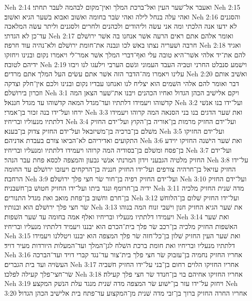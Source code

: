 Neh 2:14  ואעבר אל־שׁער העין ואל־ברכת המלך ואין־מקום לבהמה לעבר תחתי׃
Neh 2:15  ואהי עלה בנחל לילה ואהי שׂבר בחומה ואשׁוב ואבוא בשׁער הגיא ואשׁוב׃
Neh 2:16  והסגנים לא ידעו אנה הלכתי ומה אני עשׂה וליהודים ולכהנים ולחרים ולסגנים וליתר עשׂה המלאכה עד־כן לא הגדתי׃
Neh 2:17  ואומר אלהם אתם ראים הרעה אשׁר אנחנו בה אשׁר ירושׁלם חרבה ושׁעריה נצתו באשׁ לכו ונבנה את־חומת ירושׁלם ולא־נהיה עוד חרפה׃
Neh 2:18  ואגיד להם את־יד אלהי אשׁר־היא טובה עלי ואף־דברי המלך אשׁר אמר־לי ויאמרו נקום ובנינו ויחזקו ידיהם לטובה׃
Neh 2:19  וישׁמע סנבלט החרני וטביה העבד העמוני וגשׁם הערבי וילעגו לנו ויבזו עלינו ויאמרו מה־הדבר הזה אשׁר אתם עשׂים העל המלך אתם מרדים׃
Neh 2:20  ואשׁיב אותם דבר ואומר להם אלהי השׁמים הוא יצליח לנו ואנחנו עבדיו נקום ובנינו ולכם אין־חלק וצדקה וזכרון בירושׁלם׃
Neh 3:1  ויקם אלישׁיב הכהן הגדול ואחיו הכהנים ויבנו את־שׁער הצאן המה קדשׁוהו ויעמידו דלתתיו ועד־מגדל המאה קדשׁוהו עד מגדל חננאל׃
Neh 3:2  ועל־ידו בנו אנשׁי ירחו ועל־ידו בנה זכור בן־אמרי׃
Neh 3:3  ואת שׁער הדגים בנו בני הסנאה המה קרוהו ויעמידו דלתתיו מנעוליו ובריחיו׃
Neh 3:4  ועל־ידם החזיק מרמות בן־אוריה בן־הקוץ ועל־ידם החזיק משׁלם בן־ברכיה בן־משׁיזבאל ועל־ידם החזיק צדוק בן־בענא׃
Neh 3:5  ועל־ידם החזיקו התקועים ואדיריהם לא־הביאו צורם בעבדת אדניהם׃
Neh 3:6  ואת שׁער הישׁנה החזיקו יוידע בן־פסח ומשׁלם בן־בסודיה המה קרוהו ויעמידו דלתתיו ומנעליו ובריחיו׃
Neh 3:7  ועל־ידם החזיק מלטיה הגבעני וידון המרנתי אנשׁי גבעון והמצפה לכסא פחת עבר הנהר׃
Neh 3:8  על־ידו החזיק עזיאל בן־חרהיה צורפים ועל־ידו החזיק חנניה בן־הרקחים ויעזבו ירושׁלם עד החומה הרחבה׃
Neh 3:9  ועל־ידם החזיק רפיה בן־חור שׂר חצי פלך ירושׁלם׃
Neh 3:10  ועל־ידם החזיק ידיה בן־חרומף ונגד ביתו ועל־ידו החזיק חטושׁ בן־חשׁבניה׃
Neh 3:11  מדה שׁנית החזיק מלכיה בן־חרם וחשׁוב בן־פחת מואב ואת מגדל התנורים׃
Neh 3:12  ועל־ידו החזיק שׁלום בן־הלוחשׁ שׂר חצי פלך ירושׁלם הוא ובנותיו׃
Neh 3:13  את שׁער הגיא החזיק חנון וישׁבי זנוח המה בנוהו ויעמידו דלתתיו מנעליו ובריחיו ואלף אמה בחומה עד שׁער השׁפות׃
Neh 3:14  ואת שׁער האשׁפות החזיק מלכיה בן־רכב שׂר פלך בית־הכרם הוא יבננו ויעמיד דלתתיו מנעליו ובריחיו׃
Neh 3:15  ואת שׁער העין החזיק שׁלון בן־כל־חזה שׂר פלך המצפה הוא יבננו ויטללנו ויעמידו דלתתיו מנעליו ובריחיו ואת חומת ברכת השׁלח לגן־המלך ועד־המעלות היורדות מעיר דויד׃
Neh 3:16  אחריו החזיק נחמיה בן־עזבוק שׂר חצי פלך בית־צור עד־נגד קברי דויד ועד־הברכה העשׂויה ועד בית הגברים׃
Neh 3:17  אחריו החזיקו הלוים רחום בן־בני על־ידו החזיק חשׁביה שׂר־חצי־פלך קעילה לפלכו׃
Neh 3:18  אחריו החזיקו אחיהם בוי בן־חנדד שׂר חצי פלך קעילה׃
Neh 3:19  ויחזק על־ידו עזר בן־ישׁוע שׂר המצפה מדה שׁנית מנגד עלת הנשׁק המקצע׃
Neh 3:20  אחריו החרה החזיק ברוך בן־זבי מדה שׁנית מן־המקצוע עד־פתח בית אלישׁיב הכהן הגדול׃
